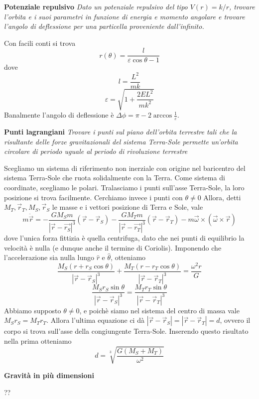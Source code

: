 \documentclass[a4paper,11pt]{article}
\begin{document}
\noindent\textbf{Potenziale repulsivo} \textit{Dato un potenziale repulsivo del tipo $V(r)=k/r$, trovare l'orbita e i suoi parametri in funzione di energia e momento angolare e trovare l'angolo di deflessione per una particella proveniente dall'infinito.}

\noindent Con facili conti si trova
$$r(\theta)=\frac{l}{\varepsilon\cos\theta-1}$$
dove 
$$l=\frac{L^2}{mk}$$
$$\varepsilon=\sqrt{1+\frac{2EL^2}{mk^2}}$$
Banalmente l'angolo di deflessione è $\Delta\phi=\pi-2\arccos\frac{1}{\varepsilon}$.
\vspace{5mm}

\noindent\textbf{Punti lagrangiani} \textit{Trovare i punti sul piano dell'orbita terrestre tali che la risultante delle forze gravitazionali del sistema Terra-Sole permette un'orbita circolare di periodo uguale al periodo di rivoluzione terrestre}

\noindent Scegliamo un sistema di riferimento non inerziale con origine nel baricentro del sistema Terra-Sole che ruota solidalmente con la Terra. Come sistema di coordinate, scegliamo le polari. Tralasciamo i punti sull'asse Terra-Sole, la loro posizione si trova facilmente. Cerchiamo invece i punti con $\theta\neq0$ Allora, detti $M_T,\vec{r}_T, M_S,\vec{r}_S$ le masse e i vettori posizione di Terra e Sole, vale
$$m\ddot{\vec{r}}=-\frac{GM_Sm}{|\vec{r}-\vec{r_S}|^3}(\vec{r}-\vec{r}_S)-\frac{GM_Tm}{|\vec{r}-\vec{r_T}|^3}(\vec{r}-\vec{r}_T)-m\vec{\omega}\times(\vec{\omega}\times\vec{r})$$
dove l'unica forza fittizia è quella centrifuga, dato che nei punti di equilibrio la velocità è nulla (e dunque anche il termine di Coriolis). Imponendo che l'accelerazione sia nulla lungo $\hat{r}$ e $\hat{\theta}$, otteniamo
$$\frac{M_S(r+r_S\cos\theta)}{|\vec{r}-\vec{r}_S|^3}+\frac{M_T(r-r_T\cos\theta)}{|\vec{r}-\vec{r}_T|^3}=\frac{\omega^2r}{G}$$
$$\frac{M_Sr_S\sin\theta}{|\vec{r}-\vec{r}_S|^3}=\frac{M_Tr_T\sin\theta}{|\vec{r}-\vec{r}_T|^3}$$
Abbiamo supposto $\theta\neq0$, e poichè siamo nel sistema del centro di massa vale $M_Sr_S=M_Tr_T$. Allora l'ultima equazione ci dà $|\vec{r}-\vec{r}_S|=|\vec{r}-\vec{r}_T|=d$, ovvero il corpo si trova sull'asse della congiungente Terra-Sole. Inserendo questo risultato nella prima otteniamo
$$d=\sqrt[3]{\frac{G(M_S+M_T)}{\omega^2}}$$
\vspace{5mm}

\noindent\textbf{Gravità in più dimensioni}

\noindent??
\vspace{5mm}
\end{document}
